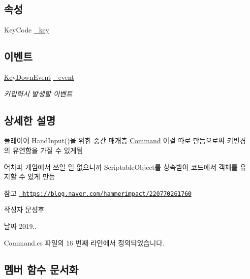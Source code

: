\subsection*{속성}
\begin{DoxyCompactItemize}
\item 
Key\+Code \mbox{\hyperlink{class_command_a85e9adc5f9994f8da6b21bbad6dfb13d}{\+\_\+key}}
\end{DoxyCompactItemize}
\subsection*{이벤트}
\begin{DoxyCompactItemize}
\item 
\mbox{\hyperlink{class_command_acc714b5e0de57b7f24b2619fff860b9d}{Key\+Down\+Event}} \mbox{\hyperlink{class_command_a04f1a7e0dc8e999e0fca2aa9210f73a3}{\+\_\+event}}
\begin{DoxyCompactList}\small\item\em 키입력시 발생할 이벤트 \end{DoxyCompactList}\end{DoxyCompactItemize}


\subsection{상세한 설명}
플레이어 Hand\+Input()을 위한 중간 매개층 \mbox{\hyperlink{class_command}{Command}} 이걸 따로 만듬으로써 키변경의 유연함을 가질 수 있게됨 

어차피 게임에서 쓰일 일 없으니까 Scriptable\+Object를 상속받아 코드에서 객체를 유지할 수 있게 만듬 \begin{DoxySeeAlso}{참고}
\href{https://blog.naver.com/hammerimpact/220770261760}{\texttt{ https\+://blog.\+naver.\+com/hammerimpact/220770261760}} 
\end{DoxySeeAlso}
\begin{DoxyAuthor}{작성자}
문성후 
\end{DoxyAuthor}
\begin{DoxyDate}{날짜}
2019.. 
\end{DoxyDate}


Command.\+cs 파일의 16 번째 라인에서 정의되었습니다.



\subsection{멤버 함수 문서화}
\mbox{\label{class_command_a1f9dcd759b1d51871f8a6efd30c3a721}} 

